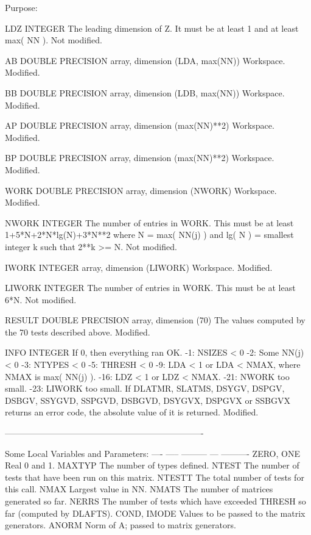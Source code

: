 \begin{DoxyParagraph}{Purpose\+: }
\begin{DoxyVerb}
  LDZ     INTEGER
          The leading dimension of Z.  It must be at least 1 and
          at least max( NN ).
          Not modified.

  AB      DOUBLE PRECISION array, dimension (LDA, max(NN))
          Workspace.
          Modified.

  BB      DOUBLE PRECISION array, dimension (LDB, max(NN))
          Workspace.
          Modified.

  AP      DOUBLE PRECISION array, dimension (max(NN)**2)
          Workspace.
          Modified.

  BP      DOUBLE PRECISION array, dimension (max(NN)**2)
          Workspace.
          Modified.

  WORK    DOUBLE PRECISION array, dimension (NWORK)
          Workspace.
          Modified.

  NWORK   INTEGER
          The number of entries in WORK.  This must be at least
          1+5*N+2*N*lg(N)+3*N**2 where N = max( NN(j) ) and
          lg( N ) = smallest integer k such that 2**k >= N.
          Not modified.

  IWORK   INTEGER array, dimension (LIWORK)
          Workspace.
          Modified.

  LIWORK  INTEGER
          The number of entries in WORK.  This must be at least 6*N.
          Not modified.

  RESULT  DOUBLE PRECISION array, dimension (70)
          The values computed by the 70 tests described above.
          Modified.

  INFO    INTEGER
          If 0, then everything ran OK.
           -1: NSIZES < 0
           -2: Some NN(j) < 0
           -3: NTYPES < 0
           -5: THRESH < 0
           -9: LDA < 1 or LDA < NMAX, where NMAX is max( NN(j) ).
          -16: LDZ < 1 or LDZ < NMAX.
          -21: NWORK too small.
          -23: LIWORK too small.
          If  DLATMR, SLATMS, DSYGV, DSPGV, DSBGV, SSYGVD, SSPGVD,
              DSBGVD, DSYGVX, DSPGVX or SSBGVX returns an error code,
              the absolute value of it is returned.
          Modified.

 ----------------------------------------------------------------------

       Some Local Variables and Parameters:
       ---- ----- --------- --- ----------
       ZERO, ONE       Real 0 and 1.
       MAXTYP          The number of types defined.
       NTEST           The number of tests that have been run
                       on this matrix.
       NTESTT          The total number of tests for this call.
       NMAX            Largest value in NN.
       NMATS           The number of matrices generated so far.
       NERRS           The number of tests which have exceeded THRESH
                       so far (computed by DLAFTS).
       COND, IMODE     Values to be passed to the matrix generators.
       ANORM           Norm of A; passed to matrix generators.


\end{DoxyVerb}
\end{DoxyParagraph}
